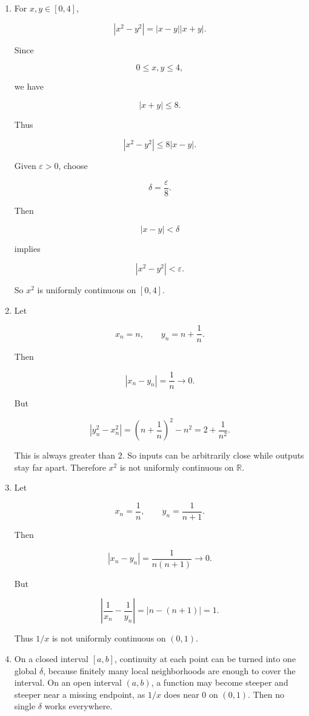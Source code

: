 \begin{enumerate}
\item
For \(x,y\in[0,4]\),

\[
|x^2-y^2|
=
|x-y||x+y|.
\]

Since

\[
0\le x,y\le4,
\]

we have

\[
|x+y|\le8.
\]

Thus

\[
|x^2-y^2|\le8|x-y|.
\]

Given \(\varepsilon>0\), choose

\[
\delta=\frac{\varepsilon}{8}.
\]

Then

\[
|x-y|<\delta
\]

implies

\[
|x^2-y^2|<\varepsilon.
\]

So \(x^2\) is uniformly continuous on \([0,4]\).

\item
Let

\[
x_n=n,
\qquad
y_n=n+\frac1n.
\]

Then

\[
|x_n-y_n|=\frac1n\to0.
\]

But

\[
|y_n^2-x_n^2|
=
\left(n+\frac1n\right)^2-n^2
=
2+\frac1{n^2}.
\]

This is always greater than \(2\).  So inputs can be arbitrarily close while outputs stay
far apart.  Therefore \(x^2\) is not uniformly continuous on \(\mathbb R\).

\item
Let

\[
x_n=\frac1n,
\qquad
y_n=\frac1{n+1}.
\]

Then

\[
|x_n-y_n|
=
\frac1{n(n+1)}
\to0.
\]

But

\[
\left|\frac1{x_n}-\frac1{y_n}\right|
=
|n-(n+1)|
=
1.
\]

Thus \(1/x\) is not uniformly continuous on \((0,1)\).

\item
On a closed interval \([a,b]\), continuity at each point can be turned into one global
\(\delta\), because finitely many local neighborhoods are enough to cover the interval.
On an open interval \((a,b)\), a function may become steeper and steeper near a missing
endpoint, as \(1/x\) does near \(0\) on \((0,1)\).  Then no single \(\delta\) works
everywhere.
\end{enumerate}